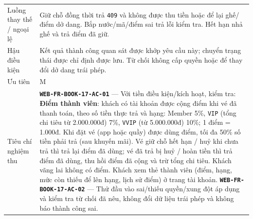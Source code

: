 \begin{longtable}{@{}P{0.23000\SRSWidth}P{0.77000\SRSWidth}@{}}
Luồng thay thế /\allowbreak{} ngoại lệ & Giữ chỗ đồng thời trả \texttt{409} và không được thu tiền hoặc để lại ghế/\allowbreak{}điểm dở dang. Bắp nước/\allowbreak{}mã/\allowbreak{}điểm sai trả lỗi kiểm tra. Hết hạn nhả ghế và trả điểm đã giữ. \\[3pt]
Hậu điều kiện & Kết quả thành công quan sát được khớp yêu cầu này; chuyển trạng thái được chỉ định được lưu. Từ chối không cấp quyền hoặc để thay đổi dở dang trái phép. \\[3pt]
Ưu tiên & M \\[3pt]
Tiêu chí nghiệm thu & \textbf{\texttt{WEB-\allowbreak{}FR-\allowbreak{}BOOK-\allowbreak{}17-\allowbreak{}AC-\allowbreak{}01}} — Với tiền điều kiện/\allowbreak{}kích hoạt, kiểm tra: \textbf{Điểm thành viên}: khách có tài khoản được cộng điểm khi vé đã thanh toán, theo số tiền thực trả và hạng: Member 5\%, \texttt{VIP} (tổng chi tiêu từ 2.000.000đ) 7\%, \texttt{VVIP} (từ 5.000.000đ) 10\%; 1 điểm = 1.000đ. Khi đặt vé (app hoặc quầy) được dùng điểm, tối đa 50\% số tiền phải trả (sau khuyến mãi). Vé giữ chỗ hết hạn /\allowbreak{} huỷ khi chưa trả thì trả lại điểm đã dùng; vé đã trả bị huỷ /\allowbreak{} hoàn tiền thì trả điểm đã dùng, thu hồi điểm đã cộng và trừ tổng chi tiêu. Khách vãng lai không có điểm. Khách xem thẻ thành viên (điểm, hạng, mức còn thiếu để lên hạng, lịch sử điểm) ở trang tài khoản. \textbf{\texttt{WEB-\allowbreak{}FR-\allowbreak{}BOOK-\allowbreak{}17-\allowbreak{}AC-\allowbreak{}02}} — Thử đầu vào sai/\allowbreak{}thiếu quyền/\allowbreak{}xung đột áp dụng và kiểm tra từ chối đã nêu, không đổi dữ liệu trái phép và không báo thành công sai. \\[3pt]

\end{longtable}
